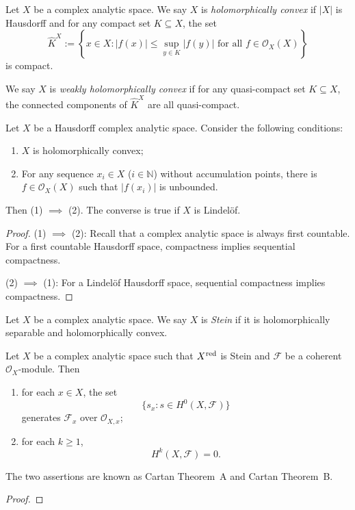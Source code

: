 \begin{definition}
    Let $X$ be a complex analytic space. We say $X$ is \emph{holomorphically convex} if $|X|$ is Hausdorff and for any compact set $K\subseteq X$, the set 
    \[
        \hat{K}^X:=\left\{ x\in X: |f(x)|\leq \sup_{y\in K}|f(y)|\text{ for all }f\in \mathcal{O}_X(X) \right\}  
    \]
    is compact.

    We say $X$ is \emph{weakly holomorphically convex} if for any quasi-compact set $K\subseteq X$, the connected components of $\hat{K}^X$ are all quasi-compact.
\end{definition}
\begin{proposition}
    Let $X$ be a Hausdorff complex analytic space. Consider the following conditions:
    \begin{enumerate}
        \item $X$ is holomorphically convex;
        \item For any sequence $x_i\in X$ ($i\in \mathbb{N}$) without accumulation points, there is $f\in \mathcal{O}_X(X)$ such that $|f(x_i)|$ is unbounded.
    \end{enumerate}
    Then (1) $\implies$ (2). The converse is true if $X$ is Lindelöf.
\end{proposition}
\begin{proof}
    (1) $\implies$ (2):
    Recall that a complex analytic space is always first countable. For a first countable Hausdorff space, compactness implies sequential compactness.

    (2) $\implies$ (1): For a Lindelöf Hausdorff space, sequential compactness implies compactness. 
\end{proof}

\begin{definition}
    Let $X$ be a complex analytic space. We say $X$ is \emph{Stein} if it is holomorphically separable and holomorphically convex.
\end{definition}

\begin{thm}
    Let $X$ be a complex analytic space such that $X^{\operatorname{red}}$ is Stein and $\mathcal{F}$ be a coherent $\mathcal{O}_X$-module. Then
    \begin{enumerate}
        \item for each $x\in X$, the set 
            \[
                \{s_x:s\in H^0(X,\mathcal{F})\}
            \]
            generates $\mathcal{F}_x$ over $\mathcal{O}_{X,x}$;
        \item for each $k\geq 1$,
            \[
                H^k(X,\mathcal{F})=0.
            \]
    \end{enumerate}
\end{thm}
The two assertions are known as Cartan Theorem~A and Cartan Theorem~B.


\begin{proof}
    
\end{proof}

\cite{stacks-project}

\printbibliography
